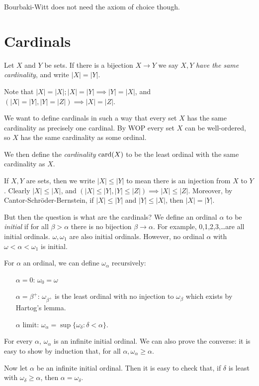 \documentclass[10pt,a4paper]{article}
\begin{document}
Bourbaki-Witt does not need the axiom of choice though.

\section{Cardinals}
Let $X$ and $Y$ be sets. If there is a bijection $X \to Y$ we say $X,Y$ \emph{have the same cardinality}, and write $|X| = |Y|$.

Note that $|X|=|X|; |X|=|Y|\implies|Y|=|X|$, and $(|X|=|Y|,|Y|=|Z|) \implies |X|=|Z|$.

We want to define cardinals in such a way that every set $X$ has the same cardinality as precisely one cardinal. By WOP every set $X$ can be well-ordered, so $X$ has the same cardinality as some ordinal.

We then define the \emph{cardinality} $\operatorname{card}(X)$ to be the least ordinal with the same cardinality as $X$. 

If $X, Y$ are sets, then we write $|X|\leq |Y|$ to mean there is an injection from $X$ to $Y$. Clearly $|X|\leq |X|$, and $(|X|\leq |Y|, |Y|\leq |Z|) \implies |X|\leq|Z|$. Moreover, by Cantor-Schr\"oder-Bernstein, if $|X|\leq |Y|$ and $|Y| \leq |X|$, then $|X|=|Y|$.

But then the question is what are the cardinals? We define an ordinal $\alpha$ to be \emph{initial} if for all $\beta > \alpha$ there is no bijection $\beta \to \alpha$. For example, 0,1,2,3,\ldots are all initial ordinals. $\omega, \omega_1$ are also initial ordinals. However, no ordinal $\alpha$ with $\omega <\alpha <\omega_1$ is initial.

For $\alpha$ an ordinal, we can define $\omega_\alpha$ recursively:
\begin{itemize}
\item[$\alpha=0$:] $\omega_0 = \omega$
\item[$\alpha=\beta^+$:] $\omega_{\beta^+}$ is the least ordinal with no injection to $\omega_{\beta}$ which exists by Hartog's lemma.
\item[$\alpha$ limit:] $\omega_\alpha = \sup\{\omega_{\delta} : \delta < \alpha\}$.
\end{itemize}
For every $\alpha$, $\omega_\alpha$ is an infinite initial ordinal. We can also prove the converse: it is easy to show by induction that, for all $\alpha, \omega_\alpha \geq \alpha$.

Now let $\alpha$ be an infinite initial ordinal. Then it is easy to check that, if $\delta$ is least with $\omega_\delta \geq \alpha$, then $\alpha = \omega_\delta$.
\end{document}
